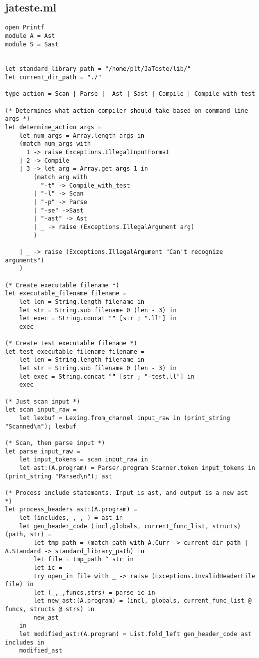 \documentclass{article}
\begin{document}
\subsection{jateste.ml}
\begin{lstlisting}
open Printf 
module A = Ast
module S = Sast


let standard_library_path = "/home/plt/JaTeste/lib/"
let current_dir_path = "./"

type action = Scan | Parse |  Ast | Sast | Compile | Compile_with_test

(* Determines what action compiler should take based on command line args *)
let determine_action args = 
	let num_args = Array.length args in
	(match num_args with
	  1 -> raise Exceptions.IllegalInputFormat
	| 2 -> Compile
	| 3 -> let arg = Array.get args 1 in 
		(match arg with
		  "-t" -> Compile_with_test
		| "-l" -> Scan
		| "-p" -> Parse
		| "-se" ->Sast
		| "-ast" -> Ast
		| _ -> raise (Exceptions.IllegalArgument arg)
		)
	
	| _ -> raise (Exceptions.IllegalArgument "Can't recognize arguments")
	)

(* Create executable filename *)
let executable_filename filename =
	let len = String.length filename in
	let str = String.sub filename 0 (len - 3) in
	let exec = String.concat "" [str ; ".ll"] in
	exec 

(* Create test executable filename *)
let test_executable_filename filename =
	let len = String.length filename in
	let str = String.sub filename 0 (len - 3) in
	let exec = String.concat "" [str ; "-test.ll"] in
	exec 

(* Just scan input *)
let scan input_raw = 
	let lexbuf = Lexing.from_channel input_raw in (print_string "Scanned\n"); lexbuf

(* Scan, then parse input *)
let parse input_raw =
	let input_tokens = scan input_raw in
	let ast:(A.program) = Parser.program Scanner.token input_tokens in (print_string "Parsed\n"); ast

(* Process include statements. Input is ast, and output is a new ast *)
let process_headers ast:(A.program) =
	let (includes,_,_,_) = ast in
	let gen_header_code (incl,globals, current_func_list, structs) (path, str) = 
		let tmp_path = (match path with A.Curr -> current_dir_path | A.Standard -> standard_library_path) in
		let file = tmp_path ^ str in
		let ic = 
		try open_in file with _ -> raise (Exceptions.InvalidHeaderFile file) in
		let (_,_,funcs,strs) = parse ic in
		let new_ast:(A.program) = (incl, globals, current_func_list @ funcs, structs @ strs) in
		new_ast 	
	in
	let modified_ast:(A.program) = List.fold_left gen_header_code ast includes in 
	modified_ast



\end{lstlisting}
\end{document}
